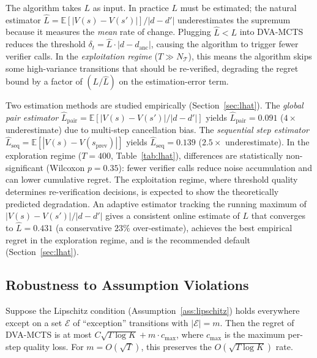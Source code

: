 \begin{remark}
\label{rem:lhat}
The algorithm takes $L$ as input. In practice $L$ must be estimated; the natural
estimator $\hat{L} = \mathbb{E}[|V(s){-}V(s')|] / |d{-}d'|$ underestimates the
supremum because it measures the \emph{mean} rate of change. Plugging $\hat{L} < L$
into DVA-MCTS reduces the threshold $\delta_t = \hat{L} \cdot |d{-}d_{\text{anc}}|$,
causing the algorithm to trigger fewer verifier calls.  In the \emph{exploitation
regime} ($T \gg N_{\mathcal{T}}$), this means the algorithm skips some high-variance
transitions that should be re-verified, degrading the regret bound by a factor of
$(L / \hat{L})$ on the estimation-error term.

Two estimation methods are studied empirically (Section~\ref{sec:lhat}).
The \emph{global pair estimator} $\hat{L}_{\text{pair}} = \mathbb{E}[|V(s){-}V(s')|/|d{-}d'|]$
yields $\hat{L}_{\text{pair}}{=}0.091$ ($4\times$ underestimate) due to multi-step
cancellation bias.  The \emph{sequential step estimator}
$\hat{L}_{\text{seq}} = \mathbb{E}[|V(s){-}V(s_{\text{prev}})|]$ yields
$\hat{L}_{\text{seq}}{=}0.139$ ($2.5\times$ underestimate).
In the exploration regime ($T{=}400$, Table~\ref{tab:lhat}), differences are
statistically non-significant (Wilcoxon $p{=}0.35$): fewer verifier calls reduce
noise accumulation and can lower cumulative regret.  The exploitation regime,
where threshold quality determines re-verification decisions, is expected to show
the theoretically predicted degradation.
An adaptive estimator tracking the running maximum of $|V(s){-}V(s')| / |d{-}d'|$
gives a consistent online estimate of $L$ that converges to $\hat{L}{=}0.431$
(a conservative $23\%$ over-estimate), achieves the best empirical regret in the
exploration regime, and is the recommended default
(Section~\ref{sec:lhat}).
\end{remark}

\subsection{Robustness to Assumption Violations}

\begin{remark}
\label{rem:robustness}
Suppose the Lipschitz condition (Assumption~\ref{ass:lipschitz}) holds everywhere
except on a set $\mathcal{E}$ of ``exception'' transitions with $|\mathcal{E}| = m$.
Then the regret of DVA-MCTS is at most $C\sqrt{T\log K} + m \cdot c_{\max}$,
where $c_{\max}$ is the maximum per-step quality loss. For $m = O(\sqrt{T})$,
this preserves the $O(\sqrt{T \log K})$ rate.
\end{remark}

